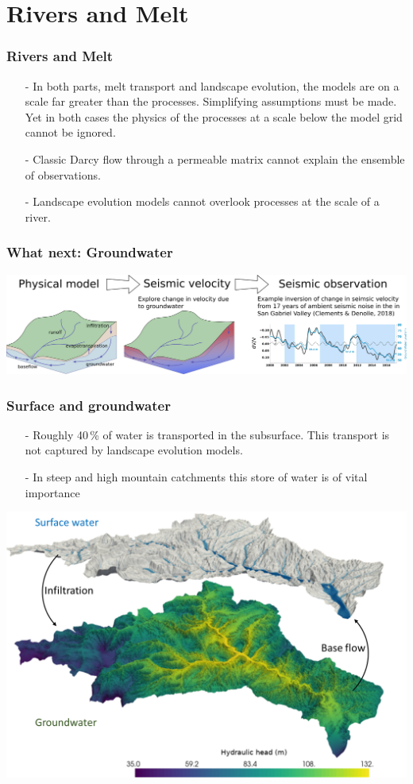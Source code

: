 \documentclass[aspectratio=169]{beamer}
\begin{document}
\section{Rivers and Melt}

\begin{frame}
    \frametitle{Rivers and Melt}
    \begin{itemize}
        \item[-]{In both parts, melt transport and landscape evolution, the models are on a scale far greater than the processes.
                 Simplifying assumptions must be made. Yet in both cases the physics of the processes at a scale below the model grid cannot be ignored.}
        \item[-]{Classic Darcy flow through a permeable matrix cannot explain the ensemble of observations.}
        \item[-]{Landscape evolution models cannot overlook processes at the scale of a river.}
    \end{itemize}
\end{frame}

\begin{frame}
    \frametitle{What next: Groundwater}
    \includegraphics[width=0.9\paperwidth]{./figures/groundwater.svg.png}
\end{frame}

\begin{frame}
    \frametitle{Surface and groundwater}
    \begin{itemize}
        \item[-]{Roughly 40\,\% of water is transported in the subsurface. This transport is not captured by landscape evolution models.}
        \item[-]{In steep and high mountain catchments this store of water is of vital importance}
    \end{itemize}
    \centering
    \includegraphics[width=0.6\paperwidth]{./pictures/graphic1.png}
\end{frame}
\end{document}
